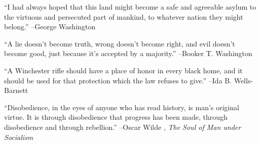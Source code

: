 \documentclass{article}%
\begin{document}
\linebreak%
\vspace{1mm}%
\begin{minipage}{\textwidth}%
\flushleft%
“I had always hoped that this land might become a safe and agreeable asylum to the virtuous and persecuted part of mankind, to whatever nation they might belong.”%
\linebreak%
\vspace{1mm}%
–George Washington%
\linebreak%
\vspace{1mm}%
\end{minipage}%
\linebreak%
\vspace{1mm}%
\begin{minipage}{\textwidth}%
\flushleft%
“A lie doesn't become truth, wrong doesn't become right, and evil doesn't become good, just because it's accepted by a majority.”%
\linebreak%
\vspace{1mm}%
–Booker T. Washington%
\linebreak%
\vspace{1mm}%
\end{minipage}%
\linebreak%
\vspace{1mm}%
\begin{minipage}{\textwidth}%
\flushleft%
“A Winchester rifle should have a place of honor in every black home, and it should be used for that protection which the law refuses to give.”%
\linebreak%
\vspace{1mm}%
–Ida B. Wells{-}Barnett%
\linebreak%
\vspace{1mm}%
\end{minipage}%
\linebreak%
\vspace{1mm}%
\begin{minipage}{\textwidth}%
\flushleft%
“Disobedience, in the eyes of anyone who has read history, is man's original virtue. It is through disobedience that progress has been made, through disobedience and through rebellion.”%
\linebreak%
\vspace{1mm}%
–Oscar Wilde%
, \textit{The Soul of Man under Socialism}%
\linebreak%
\vspace{1mm}%
\end{minipage}%
\linebreak%
\end{document}
